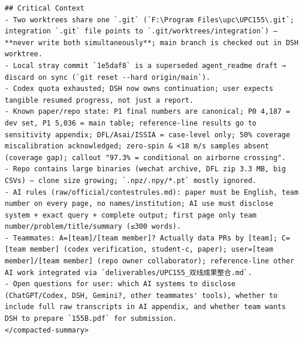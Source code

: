\documentclass[UTF8,10pt]{ctexart}
\begin{document}
\begin{Verbatim}[breaklines=true,breakanywhere=true,fontsize=\scriptsize,frame=single,framesep=2pt]
## Critical Context
- Two worktrees share one `.git` (`F:\Program Files\upc\UPC155\.git`; integration `.git` file points to `.git/worktrees/integration`) — **never write both simultaneously**; main branch is checked out in DSH worktree.
- Local stray commit `1e5daf8` is a superseded agent_readme draft → discard on sync (`git reset --hard origin/main`).
- Codex quota exhausted; DSH now owns continuation; user expects tangible resumed progress, not just a report.
- Known paper/repo state: P1 final numbers are canonical; P0 4,187 = dev set, P1 5,036 = main table; reference-line results go to sensitivity appendix; DFL/Asai/ISSIA = case-level only; 50% coverage miscalibration acknowledged; zero-spin & <18 m/s samples absent (coverage gap); callout "97.3% = conditional on airborne crossing".
- Repo contains large binaries (wechat archive, DFL zip 3.3 MB, big CSVs) — clone size growing; `.npz/.npy/*.pt` mostly ignored.
- AI rules (raw/official/contestrules.md): paper must be English, team number on every page, no names/institution; AI use must disclose system + exact query + complete output; first page only team number/problem/title/summary (≤300 words).
- Teammates: A=[team]/[team member]? Actually data PRs by [team]; C=[team member] (codex verification, student-c, paper); user=[team member]/[team member] (repo owner collaborator); reference-line other AI work integrated via `deliverables/UPC155_双线成果整合.md`.
- Open questions for user: which AI systems to disclose (ChatGPT/Codex, DSH, Gemini?, other teammates' tools), whether to include full raw transcripts in AI appendix, and whether team wants DSH to prepare `155B.pdf` for submission.
</compacted-summary>
\end{Verbatim}
\end{document}
